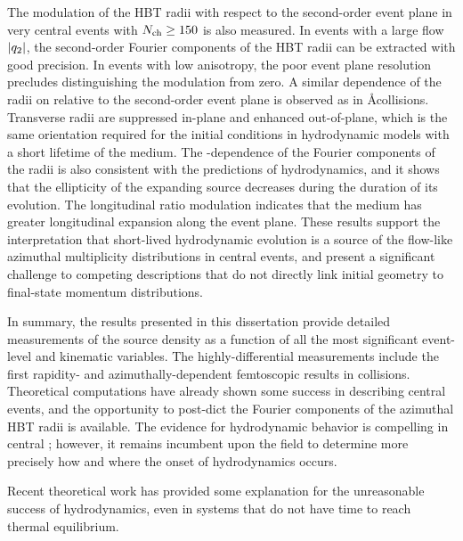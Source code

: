 The modulation of the HBT radii with respect to the second-order event plane in very central \pPb events with $\mbox{$N_{\mathrm{ch}}$} \geq 150$ is also measured.
In events with a large flow $|q_{2}|$, the second-order Fourier components of the HBT radii can be extracted with good precision.
In events with low anisotropy, the poor event plane resolution precludes distinguishing the modulation from zero.
A similar dependence of the radii on \tdpk relative to the second-order event plane is observed as in \AA collisions.
Transverse radii are suppressed in-plane and enhanced out-of-plane, which is the same orientation required for the initial conditions in hydrodynamic models with a short lifetime of the medium.
The \kt-dependence of the Fourier components of the radii is also consistent with the predictions of hydrodynamics, and it shows that the ellipticity of the expanding source decreases during the duration of its evolution.
The longitudinal ratio \Rlong modulation indicates that the medium has greater longitudinal expansion along the event plane.
These results support the interpretation that short-lived hydrodynamic evolution is a source of the flow-like azimuthal multiplicity distributions in central \pPb events, and present a significant challenge to competing descriptions that do not directly link initial geometry to final-state momentum distributions.

In summary, the results presented in this dissertation provide detailed measurements of the \pPb source density as a function of all the most significant event-level and kinematic variables.
The highly-differential measurements include the first rapidity- and azimuthally-dependent femtoscopic results in \pA collisions.
Theoretical computations have already shown some success in describing central \pPb events, and the opportunity to post-dict the Fourier components of the azimuthal HBT radii is available.
The evidence for hydrodynamic behavior is compelling in central \pPb; however, it remains incumbent upon the field to determine more precisely how and where the onset of hydrodynamics occurs.

Recent theoretical work has provided some explanation for the unreasonable success of hydrodynamics, even in systems that do not have time to reach thermal equilibrium.
